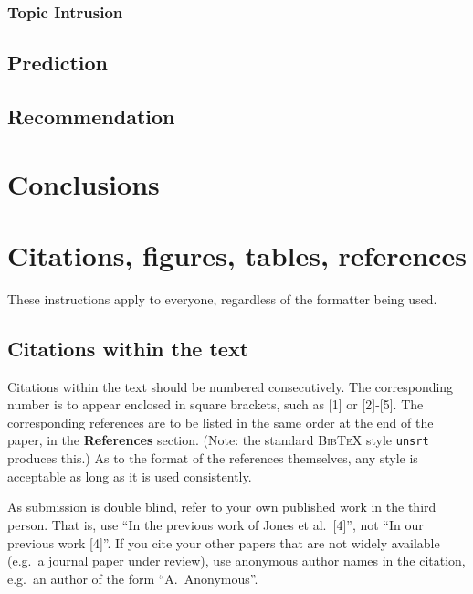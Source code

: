 \documentclass{article} %
\begin{document}
\subsubsection{Topic Intrusion}

\subsection{Prediction}


\subsection{Recommendation}









\section{Conclusions}


\section{Citations, figures, tables, references}
\label{others}

These instructions apply to everyone, regardless of the formatter being used.

\subsection{Citations within the text}

Citations within the text should be numbered consecutively. The corresponding
number is to appear enclosed in square brackets, such as [1] or [2]-[5]. The
corresponding references are to be listed in the same order at the end of the
paper, in the \textbf{References} section. (Note: the standard
\textsc{Bib\TeX} style \texttt{unsrt} produces this.) As to the format of the
references themselves, any style is acceptable as long as it is used
consistently.

As submission is double blind, refer to your own published work in the 
third person. That is, use ``In the previous work of Jones et al.\ [4]'',
not ``In our previous work [4]''. If you cite your other papers that
are not widely available (e.g.\ a journal paper under review), use
anonymous author names in the citation, e.g.\ an author of the
form ``A.\ Anonymous''. 
\end{document}
